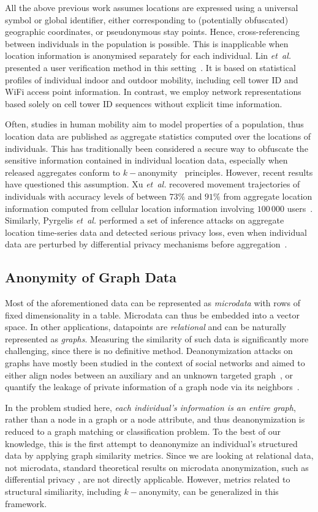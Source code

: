 All the above previous work assumes locations are expressed using a universal symbol or global identifier, either corresponding to (potentially obfuscated) geographic coordinates, or pseudonymous stay points.
Hence, cross-referencing between individuals in the population is possible.
This is inapplicable when location information is anonymised separately for each individual.
Lin \emph{et~al.} presented a user verification method in this setting~\cite{LinMobile}.
It is based on statistical profiles of individual indoor and outdoor mobility, including cell tower ID and WiFi access point information.
In contrast, we employ network representations based solely on cell tower ID sequences without explicit time information.

Often, studies in human mobility aim to model properties of a population, thus location data are published as aggregate statistics computed over the locations of individuals.
This has traditionally been considered a secure way to obfuscate the sensitive information contained in individual location data, especially when released aggregates conform to $ k-$anonymity~\cite{sweeney2002k} principles.
However, recent results have questioned this assumption.
Xu \emph{et~al.} recovered movement trajectories of individuals with accuracy levels of between $73\%$ and $91\%$ from aggregate location information computed from cellular location information involving $100\,000$ users~\cite{xu2017trajectory}. Similarly, Pyrgelis \emph{et~al.} performed a set of inference attacks on aggregate location time-series data and detected serious privacy loss, even when individual data are perturbed by differential privacy mechanisms before aggregation~\cite{pyrgelis2017does}.

\subsection{Anonymity of Graph Data }
Most of the aforementioned data can be represented as \emph{microdata} with rows of fixed dimensionality in a table.
Microdata can thus be embedded into a vector space.
In other applications, datapoints are \emph{relational} and can be naturally represented as \emph{graphs}.
Measuring the similarity of such data is significantly more challenging, since there is no definitive method.
Deanonymization attacks on graphs have mostly been studied in the context of social networks and aimed to either align nodes between an auxiliary and an unknown targeted graph~\cite{narayanan2009anonymizing, sharad2014}, or quantify the leakage of private information of a graph node via its neighbors~\cite{zheleva09}.

In the problem studied here, \emph{each individual's information is an entire graph}, rather than a node in a graph or a node attribute, and thus deanonymization is reduced to a graph matching or classification problem.
To the best of our knowledge, this is the first attempt to deanonymize an individual's structured data by applying graph similarity metrics.
Since we are looking at relational data, not microdata, standard theoretical results on microdata anonymization, such as differential privacy \cite{dwork2006calibrating}, are not directly applicable.
However, metrics related to structural similiarity, including $k-$anonymity, can be generalized in this framework.
